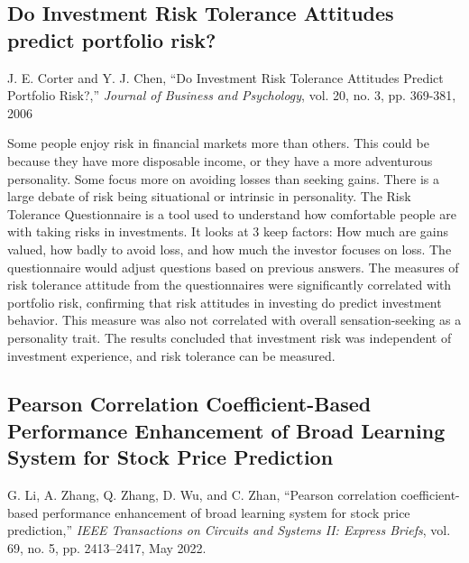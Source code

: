 \documentclass[12pt]{article}
\begin{document}
\subsection{Do Investment Risk Tolerance Attitudes predict portfolio risk?}
J. E. Corter and Y. J. Chen, “Do Investment Risk Tolerance Attitudes Predict Portfolio Risk?,” \textit{Journal of Business and Psychology}, vol. 20, no. 3, pp. 369-381, 2006
\newline

Some people enjoy risk in financial markets more than others. This could be because they have more disposable income, or they have a more adventurous personality. Some focus more on avoiding losses than seeking gains. There is a large debate of risk being situational or intrinsic in personality. The Risk Tolerance Questionnaire is a tool used to understand how comfortable people are with taking risks in investments. It looks at 3 keep factors: How much are gains valued, how badly to avoid loss, and how much the investor focuses on loss. The questionnaire would adjust questions based on previous answers. The measures of risk tolerance attitude from the questionnaires were significantly correlated with portfolio risk, confirming that risk attitudes in investing do predict investment behavior. This measure was also not correlated with overall sensation-seeking as a personality trait. The results concluded that investment risk was independent of investment experience, and risk tolerance can be measured.


\subsection{Pearson Correlation Coefficient-Based Performance Enhancement of Broad Learning System for Stock Price Prediction}
G. Li, A. Zhang, Q. Zhang, D. Wu, and C. Zhan, “Pearson correlation coefficient-based performance enhancement of broad learning system for stock price prediction,” \textit{IEEE Transactions on Circuits and Systems II: Express Briefs}, vol. 69, no. 5, pp. 2413–2417, May 2022. %
\newline
\end{document}
